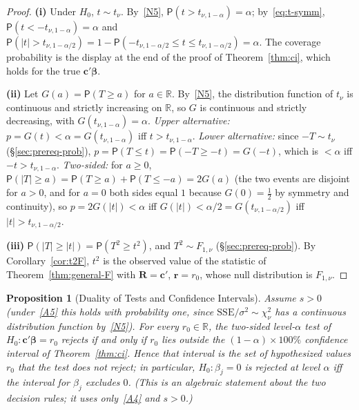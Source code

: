 \documentclass[14pt]{extarticle}
\theoremstyle{plain}
\newtheorem{proposition}[theorem]{Proposition}
\theoremstyle{definition}
\theoremstyle{remark}
\newcommand\prb{\mathsf{P}}
\newcommand{\SSE}{\mathrm{SSE}}
\def\bb{\boldsymbol{\beta}}
\newcommand{\bR}{\mathbf{R}}
\newcommand{\br}{\mathbf{r}}
\def\bc{\mathbf{c}}
\newcommand{\Real}{\mathbb{R}}
\begin{document}
\begin{proof}
\textbf{(i)} Under $H_0$, $t \sim t_\nu$. By~\ref{N5}, $\prb(t > t_{\nu,1-\alpha}) = \alpha$; by~\eqref{eq:t-symm}, $\prb(t < -t_{\nu,1-\alpha}) = \alpha$ and $\prb(|t| > t_{\nu,1-\alpha/2}) = 1 - \prb(-t_{\nu,1-\alpha/2} \leqslant t \leqslant t_{\nu,1-\alpha/2}) = \alpha$. The coverage probability is the display at the end of the proof of Theorem~\ref{thm:ci}, which holds for the true $\bc'\bb$.

\textbf{(ii)} Let $G(a) = \prb(T \geqslant a)$ for $a \in \Real$. By~\ref{N5}, the distribution function of $t_\nu$ is continuous and strictly increasing on $\Real$, so $G$ is continuous and strictly decreasing, with $G(t_{\nu,1-\alpha}) = \alpha$. \emph{Upper alternative:} $p = G(t) < \alpha = G(t_{\nu,1-\alpha})$ iff $t > t_{\nu,1-\alpha}$. \emph{Lower alternative:} since $-T \sim t_\nu$ (\S\ref{sec:prereq-prob}), $p = \prb(T \leqslant t) = \prb(-T \geqslant -t) = G(-t)$, which is $< \alpha$ iff $-t > t_{\nu,1-\alpha}$. \emph{Two-sided:} for $a \geqslant 0$, $\prb(|T| \geqslant a) = \prb(T \geqslant a) + \prb(T \leqslant -a) = 2G(a)$ (the two events are disjoint for $a > 0$, and for $a = 0$ both sides equal $1$ because $G(0) = \frac{1}{2}$ by symmetry and continuity), so $p = 2G(|t|) < \alpha$ iff $G(|t|) < \alpha/2 = G(t_{\nu,1-\alpha/2})$ iff $|t| > t_{\nu,1-\alpha/2}$.

\textbf{(iii)} $\prb(|T| \geqslant |t|) = \prb(T^2 \geqslant t^2)$, and $T^2 \sim F_{1,\nu}$ (\S\ref{sec:prereq-prob}). By Corollary~\ref{cor:t2F}, $t^2$ is the observed value of the statistic of Theorem~\ref{thm:general-F} with $\bR = \bc'$, $\br = r_0$, whose null distribution is $F_{1,\nu}$.
\end{proof}

\begin{proposition}[Duality of Tests and Confidence Intervals]\label{prop:duality}
Assume $s > 0$ (under~\ref{A5} this holds with probability one, since $\SSE/\sigma^2 \sim \chi^2_\nu$ has a continuous distribution function by~\ref{N5}). For every $r_0 \in \Real$, the two-sided level-$\alpha$ test of $H_0\colon \bc'\bb = r_0$ rejects if and only if $r_0$ lies outside the $(1-\alpha) \times 100\%$ confidence interval of Theorem~\ref{thm:ci}. Hence that interval is the set of hypothesized values $r_0$ that the test does not reject; in particular, $H_0\colon \beta_j = 0$ is rejected at level $\alpha$ iff the interval for $\beta_j$ excludes $0$. (This is an algebraic statement about the two decision rules; it uses only~\ref{A4} and $s > 0$.)
\end{proposition}
\end{document}
